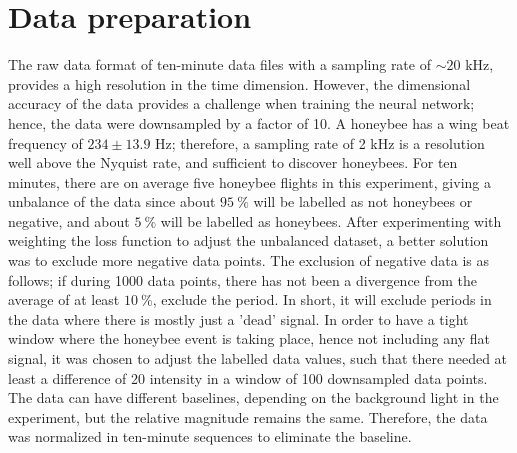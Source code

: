 \section{Data preparation}\label{sec:data-preparation}

The raw data format of ten-minute data files with a sampling rate of $\sim 20$ kHz, provides a high resolution in the time dimension.
However, the dimensional accuracy of the data provides a challenge when training the neural network; hence, the data were downsampled by a factor of 10.
A honeybee has a wing beat frequency of $234 \pm 13.9$ Hz\cite{10.1242/jeb.154609}; therefore, a sampling rate of 2 kHz is a resolution well above the Nyquist rate, and sufficient to discover honeybees.
For ten minutes, there are on average five honeybee flights in this experiment, giving a unbalance of the data since about $95 \:  \%$ will be labelled as not honeybees or negative, and about $5 \:  \%$ will be labelled as honeybees.
After experimenting with weighting the loss function to adjust the unbalanced dataset, a better solution was to exclude more negative data points.
The exclusion of negative data is as follows; if during 1000 data points, there has not been a divergence from the average of at least $10 \: \%$, exclude the period.
In short, it will exclude periods in the data where there is mostly just a 'dead' signal.
In order to have a tight window where the honeybee event is taking place, hence not including any flat signal, it was chosen to adjust the labelled data values, such that there needed at least a difference of 20 intensity in a window of 100 downsampled data points.
The data can have different baselines, depending on the background light in the experiment, but the relative magnitude remains the same.
Therefore, the data was normalized in ten-minute sequences to eliminate the baseline.

